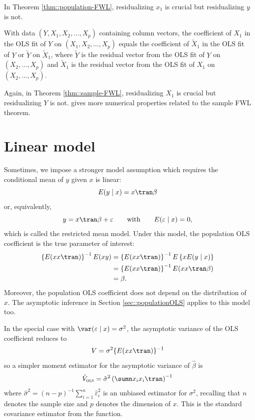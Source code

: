 In Theorem \ref{thm::population-FWL},  residualizing $x_1$ is crucial but residualizing $y$ is not.   



\begin{theorem}
\label{thm::sample-FWL}
With data $(Y, X_1, X_2, \ldots, X_p)$ containing column vectors, the coefficient of $X_1$ in the OLS fit of $Y$ on $(X_1, X_2, \ldots, X_p)$  equals the coefficient of $\tilde{X}_1$ in the OLS fit of $Y$ or $\tilde{Y}$ on $\tilde{X}_1$, where $\tilde{Y}$ is the residual vector from the OLS fit of $Y$ on $(X_2, \ldots, X_p)$ and $\tilde{X}_1$ is the residual vector  from the OLS fit of $X_1$ on $(X_2, \ldots, X_p)$. 
\end{theorem}


Again, in Theorem \ref{thm::sample-FWL}, residualizing $X_1$ is crucial but residualizing $Y$ is not. 
\citet{ding2021frisch} gives more numerical properties related to the sample FWL theorem.
 

\section{Linear model}\label{section::linear-model-var}

Sometimes, we impose a stronger model assumption which requires the conditional mean of $y$ given $x$ is linear:
$$
E(y\mid x)=x \tran \beta
$$
or, equivalently, 
\[
y=x \tran \beta+\varepsilon \qquad  \text{with} \qquad  E(\varepsilon\mid x)=0,
\]
which is called the restricted mean model. Under this model,  the population OLS coefficient is the true parameter of interest:
\begin{align*}
\left\{ E(xx \tran )\right\} ^{-1}E(xy) & =\left\{ E(xx \tran )\right\} ^{-1}E\left\{ xE(y\mid x)\right\} \\
 & =\left\{ E(xx \tran )\right\} ^{-1}E(xx \tran \beta)\\
 & =\beta.
\end{align*}
Moreover, the population OLS coefficient does not depend on the distribution
of $x$. The asymptotic inference in Section \ref{sec::populationOLS} applies to this model too. 



In the special case with $\var(\varepsilon \mid x) = \sigma^2$, 
the asymptotic variance of the OLS coefficient reduces to
$$
V = \sigma^2 \{ E(xx \tran ) \}^{-1}
$$
so a simpler moment estimator for the asymptotic variance of $\hat{\beta}$ is 
\begin{equation}
\hat{V}_\textsc{ols} = \hat\sigma^2 \left( \sumn x_{i}x_{i} \tran \right)^{-1}
\label{eq::v-hat-ols}
\end{equation}
where $\hat\sigma^2 =  (n-p)^{-1}  \sum_{i=1}^n \hat{\varepsilon}_i^2$ is an unbiased estimator for $\sigma^2$, recalling that $n$ denotes the sample size and $p$ denotes the dimension of $x$. This is the standard covariance estimator from the  function. 




